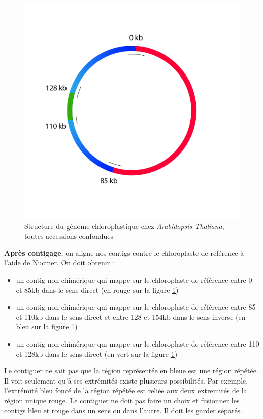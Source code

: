 \documentclass[a4paper]{article}
\begin{document}
\begin{figure}[H]
\centering
\includegraphics[scale=0.8] {Assemblage/schemachloro.png}
\caption{Structure du génome chloroplastique chez \textit{Arabidopsis Thaliana}, toutes accessions confondues}
\label{schemachloro}
\end{figure}

\textbf{Après contigage}, on aligne nos contigs contre le chloroplaste de référence à l'aide de Nucmer.  On doit obtenir :
\begin{itemize}
\item un contig non chimérique qui mappe sur le chloroplaste de référence entre 0 et 85kb dans le sens direct (en rouge sur la figure \ref{schemachloro})
\item un contig non chimérique  qui mappe sur le chloroplaste de référence entre 85 et 110kb dans le sens direct et entre 128 et 154kb dans le sens inverse (en bleu sur la figure \ref{schemachloro})
\item un contig non chimérique  qui mappe sur le chloroplaste de référence entre 110 et 128kb dans le sens direct (en vert sur la figure \ref{schemachloro})
\end{itemize}

Le contiguer ne sait pas que la région représentée en bleue est une région répétée. Il voit seulement qu'à ses extrémités existe plusieurs possibilités. Par exemple, l'extrémité bleu foncé de la région répétée est reliée aux deux extremités de la région unique rouge. Le contiguer ne doit pas faire un choix et fusionner les contigs bleu et rouge dans un sens ou dans l'autre. Il doit les garder séparés. 
\end{document}
